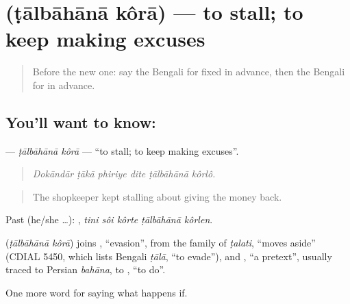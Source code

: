 \section[\texorpdfstring{\bn{টালবাহানা} \bn{করা} (ṭālbāhānā kôrā)}{টালবাহানা করা (ṭālbāhānā kôrā)}]{  (ṭālbāhānā kôrā) — to stall; to keep making excuses}

\label{lesson:BN-C530-talbahana-kora}



\begin{quote}
Before the new one: say the Bengali for fixed in advance, then the Bengali for in advance.
\end{quote}

\subsection*{You'll want to know:  }
\textbf{ } — \emph{ṭālbāhānā kôrā} — \textquotedblleft{}to stall; to keep making excuses\textquotedblright{}.

\begin{quote}
     
\end{quote}

\begin{quote}
\emph{Dokāndār ṭākā phiriye dite ṭālbāhānā kôrlô.}
\end{quote}

\begin{quote}
The shopkeeper kept stalling about giving the money back.
\end{quote}

Past (he/she …):     , \emph{tini sôi kôrte ṭālbāhānā kôrlen}.

\begin{cousinweb}
\textbf{ } (\emph{ṭālbāhānā kôrā}) joins , \textquotedblleft{}evasion\textquotedblright{}, from the family of \emph{ṭalati}, \textquotedblleft{}moves aside\textquotedblright{} (CDIAL 5450, which lists Bengali \emph{ṭālā}, \textquotedblleft{}to evade\textquotedblright{}), and , \textquotedblleft{}a pretext\textquotedblright{}, usually traced to Persian \emph{bahāna}, to , \textquotedblleft{}to do\textquotedblright{}.
\end{cousinweb}

\begin{grammarlens}[title={What you've built}]
One more word for saying what happens if.
\end{grammarlens}

